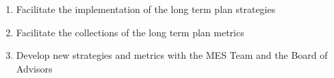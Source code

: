 \begin{enumerate}
  \begin{enumerate}
   \item
    Facilitate the implementation of the long term plan strategies
   \item
    Facilitate the collections of the long term plan metrics
   \item
    Develop new strategies and metrics with the MES Team and the Board of Advisors
  \end{enumerate}
\end{enumerate}